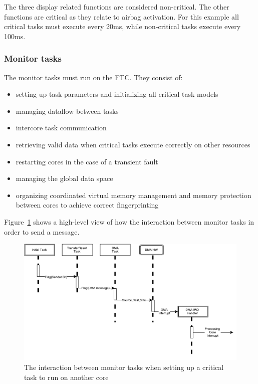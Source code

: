 \documentclass[table,11pt]{article}
\begin{document}
The three display related functions are considered non-critical. The other functions are critical as they relate to airbag activation. For this example all critical tasks must execute every 20ms, while non-critical tasks execute every 100ms.

\subsubsection{Monitor tasks}
The monitor tasks must run on the FTC. They consist of:
\begin{itemize}
  \item setting up task parameters and initializing all critical task models
  \item managing dataflow between tasks 
  \item intercore task communication 
  \item retrieving valid data when critical tasks execute correctly on other resources 
  \item restarting cores in the case of a transient fault
  \item managing the global data space
  \item organizing coordinated virtual memory management and memory protection between cores to achieve correct fingerprinting
\end{itemize} 

Figure~\ref{f:monitor-send} shows a high-level view of how the interaction between monitor tasks in order to send a message.

\begin{figure}
\centering
\includegraphics[scale=0.7]{figures/monitor-send.pdf}
\caption{The interaction between monitor tasks when setting up a critical task to run on another core}
\label{f:monitor-send}
\end{figure}
\end{document}

